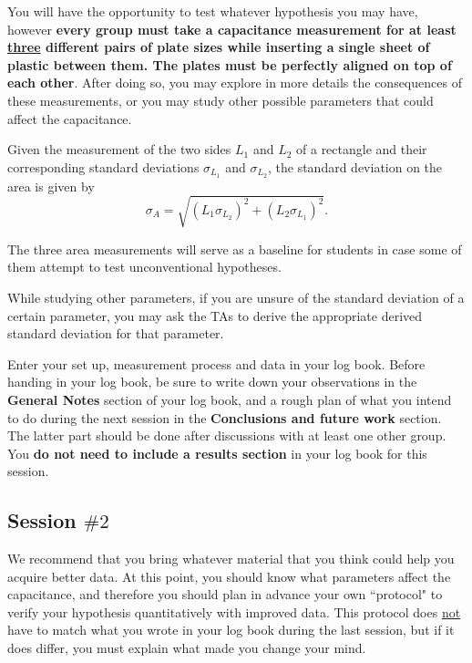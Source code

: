 \documentclass[12pt]{report}
\begin{document}
You will have the opportunity to test whatever hypothesis you may have, however \textbf{every group must take a capacitance measurement for at least \underline{three} different pairs of plate sizes while inserting a single sheet of plastic between them. The plates must be perfectly aligned on top of each other}. After doing so, you may explore in more details the consequences of these measurements, or you may study other possible parameters that could affect the capacitance.

Given the measurement of the two sides $L_1$ and $L_2$ of a rectangle and their corresponding standard deviations $\sigma_{L_1}$ and $\sigma_{L_2}$, the standard deviation on the area is given by
\begin{equation}
\sigma_A = \sqrt{ \left( L_1 \sigma_{L_2} \right)^2 + \left( L_2 \sigma_{L_1} \right)^2 }.
\end{equation}

\begin{tcolorbox}
The three area measurements will serve as a baseline for students in case some of them attempt to test unconventional hypotheses.
\end{tcolorbox}

While studying other parameters, if you are unsure of the standard deviation of a certain parameter, you may ask the TAs to derive the appropriate derived standard deviation for that parameter.

Enter your set up, measurement process and data in your log book. Before handing in your log book, be sure to write down your observations in the \textbf{General Notes} section of your log book, and a rough plan of what you intend to do during the next session in the \textbf{Conclusions and future work} section. The latter part should be done after discussions with at least one other group. You \textbf{do not need to include a results section} in your log book for this session.

\subsection{Session $\# 2$}
We recommend that you bring whatever material that you think could help you acquire better data. At this point, you should know what parameters affect the capacitance, and therefore you should plan in advance your own ``protocol" to verify your hypothesis quantitatively with improved data. This protocol does \underline{not} have to match what you wrote in your log book during the last session, but if it does differ, you must explain what made you change your mind.
\end{document}
